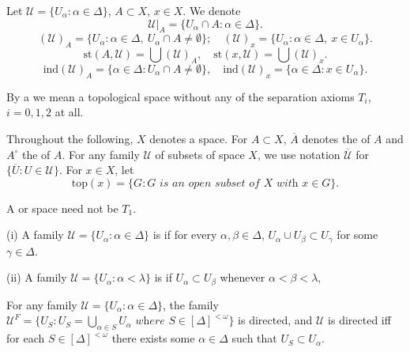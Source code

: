 \documentclass[prelim.tex]{subfiles}
\begin{document}
Let $\mathscr{U} = \{U_\alpha: \alpha \in \Delta\}$, $A \subset X$, $x \in X$. We denote
$$
	\mathscr{U}|_A = \{U_\alpha \cap A: \alpha \in \Delta\}.$$
$$
	(\mathscr{U})_A = \{U_\alpha: \alpha \in \Delta, 
	\ U_\alpha \cap A \neq \emptyset\}; \quad (\mathscr{U})_x = \{U_\alpha: \alpha \in \Delta, \ x \in U_\alpha\}.$$
$$	
   \text{st}(A, \mathscr{U}) = \bigcup (\mathscr{U})_A, 
   \quad \text{st}(x, \mathscr{U}) = \bigcup (\mathscr{U})_x.$$
$$
   \text{ind}(\mathscr{U})_A = \{\alpha \in \Delta: 
   U_\alpha \cap A \neq \emptyset\}, \quad 
  \text{ind}(\mathscr{U})_x = \{\alpha \in \Delta: x \in U_\alpha\}.$$

By a   
we mean a topological space without any of the separation axioms $T_i$, $i=0,1,2$ at all.

Throughout the following, $X$ denotes a space. For $A \subset X$, $\overline{A}$ denotes the 
of $A$ and $A^\circ$ the 
 of $A$. 
 For any family $\mathscr{U}$ of subsets of space $X$, we use notation
 $\overline{\mathscr{U}}$ for  $\{\overline{U}: U\in\mathscr{U}\}$.
 For $x \in X$, let
$$
	\text{top}(x) = \{G: G \textit{ is an open subset of } X 
	\textit{ with } x \in G\}.$$
	
A  
or  
space need not be $T_1$.	

{ \label{def:1.1.1}
\textup{(i)} A family $\mathscr{U} = \{ U_\alpha: \alpha\in \Delta\}$  is
	if for every $\alpha, \beta \in \Delta$, 
	$U_\alpha\cup U_\beta	\subset U_\gamma$ for some $\gamma\in\Delta$. 
	
\textup{(ii)} A family $\mathscr{U} = \{ U_\alpha: \alpha < \lambda\}$  is
   if $U_\alpha\subset U_\beta$
   whenever $\alpha < \beta <\lambda$, 
} %

\vspace{8pt}
For any family $\mathscr{U} = \{ U_\alpha: \alpha\in \Delta\}$, the family
$\mathscr{U}^F = \{U_S: U_S = \bigcup_{\alpha\in S}U_\alpha 
	\textit{ where } S\in[\Delta]^{<\omega}\}$ 
is directed, and 
$\mathscr{U}$ is directed iff for each $S\in [\Delta]^{<\omega}$
there exists some $\alpha\in\Delta$ such that $U_S\subset U_\alpha$.
\end{document}
